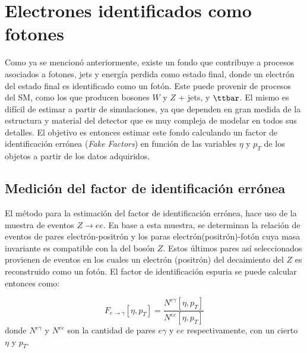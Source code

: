 \chapter{Electrones identificados como fotones}\label{ch:e_fake}


Como ya se mencionó anteriormente, existe un fondo que contribuye a procesos asociados a fotones, jets y energía perdida como estado final, donde un electrón del estado final es identificado como un fotón. Este puede provenir de procesos del SM, como los que producen bosones $W$ y $Z$ + jets, y $\ttbar$. El mismo es difícil de estimar a partir de simulaciones, ya que dependen en gran medida de la estructura y material del detector que es muy compleja de modelar en todos sus detalles. El objetivo es entonces estimar este fondo calculando un factor de identificación errónea (\textit{Fake Factors}) en función de las variables $\eta$ y $p_{T}$ de los objetos a partir de los datos adquiridos.

\section{Medición del factor de identificación errónea}

El método para la estimación del factor de identificación errónea, hace uso de la muestra de eventos $Z\rightarrow ee$. En base a esta muestra, se determinan la relación de eventos de pares electrón-positrón y los paras electrón(positrón)-fotón cuya masa invariante es compatible con la del bosón $Z$. Estos últimos pares así seleccionados provienen de eventos en los cuales un electrón (positrón) del decaimiento del $Z$ es reconstruido como un fotón. El factor de identificación espuria se puede calcular entonces como: 

\begin{equation}
F_{e\rightarrow\gamma}[\eta , p_{T}]=\frac{N^{e\gamma}[\eta , p_{T}]}{N^{ee}[\eta , p_{T}]} \label{eq:ff_ratio}
\end{equation}
%
donde $N^{e\gamma}$ y $N^{ee}$ son la cantidad de pares $e\gamma$ y $ee$ respectivamente, con un cierto $\eta$ y $p_{T}$.


